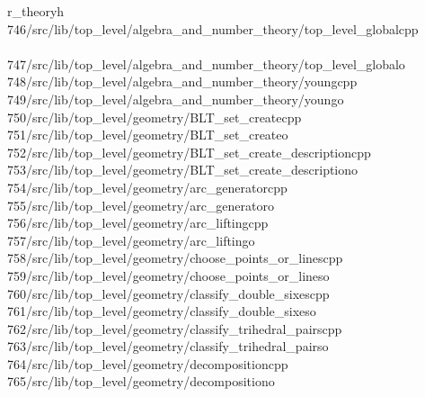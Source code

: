 \begin{tabbing}
\>r\_theoryh\\[0pt]
746\>/src/lib/top\_level/algebra\_and\_number\_theory/top\_level\_globalcpp\\[0pt]
\>\\[0pt]
747\>/src/lib/top\_level/algebra\_and\_number\_theory/top\_level\_globalo\\[0pt]
748\>/src/lib/top\_level/algebra\_and\_number\_theory/youngcpp\\[0pt]
749\>/src/lib/top\_level/algebra\_and\_number\_theory/youngo\\[0pt]
750\>/src/lib/top\_level/geometry/BLT\_set\_createcpp\\[0pt]
751\>/src/lib/top\_level/geometry/BLT\_set\_createo\\[0pt]
752\>/src/lib/top\_level/geometry/BLT\_set\_create\_descriptioncpp\\[0pt]
753\>/src/lib/top\_level/geometry/BLT\_set\_create\_descriptiono\\[0pt]
754\>/src/lib/top\_level/geometry/arc\_generatorcpp\\[0pt]
755\>/src/lib/top\_level/geometry/arc\_generatoro\\[0pt]
756\>/src/lib/top\_level/geometry/arc\_liftingcpp\\[0pt]
757\>/src/lib/top\_level/geometry/arc\_liftingo\\[0pt]
758\>/src/lib/top\_level/geometry/choose\_points\_or\_linescpp\\[0pt]
759\>/src/lib/top\_level/geometry/choose\_points\_or\_lineso\\[0pt]
760\>/src/lib/top\_level/geometry/classify\_double\_sixescpp\\[0pt]
761\>/src/lib/top\_level/geometry/classify\_double\_sixeso\\[0pt]
762\>/src/lib/top\_level/geometry/classify\_trihedral\_pairscpp\\[0pt]
763\>/src/lib/top\_level/geometry/classify\_trihedral\_pairso\\[0pt]
764\>/src/lib/top\_level/geometry/decompositioncpp\\[0pt]
765\>/src/lib/top\_level/geometry/decompositiono\\[0pt]

\end{tabbing}
